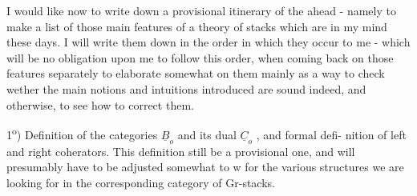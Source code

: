 
 I would like now to write down a provisional itinerary of the 
ahead - namely to make a list of those main features of a theory of
\margin{$\times$} stacks which are in my mind these days. I will write them down in the
order in which they occur to me - which will be no obligation upon me
to follow this order, when coming back on those features separately to
elaborate somewhat on them  mainly as a way to check wether the main
notions and intuitions introduced are sound indeed, and otherwise, to
see how to correct them.

1\textsuperscript{o}) Definition of the categories $\underline{B}_o$ and its dual $\underline{C}_o$ , and formal defi-%
nition of left and right coherators. This definition  still be a
provisional one, and will presumably have to be adjusted somewhat to
w for the various structures we are looking for in the corresponding
category of Gr-stacks.

